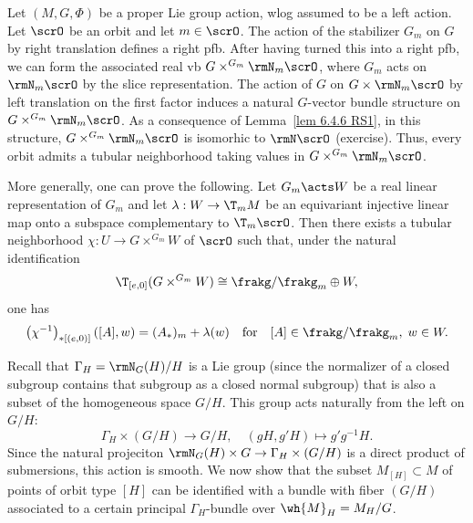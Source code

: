 \begin{rem}[{{\cite[Rem.~6.5.8]{RS1}}}]\label{rem 6.5.8 RS1}
    Let $(M,G,\Phi)$ be a proper Lie group action, \gls{wlog} assumed to be a left action. Let $\scrO$ be an orbit and let $m\in\scrO$. The action of the stabilizer $G_m$ on $G$ by right translation defines a right \gls{pfb}. After having turned this into a right \gls{pfb}, we can form the associated real \gls{vb} $G\times^{G_m}\rmN_m\scrO$, where $G_m$ acts on $\rmN_m\scrO$ by the slice representation. The action of $G$ on $G\times\rmN_m\scrO$ by left translation on the first factor induces a natural $G$-vector bundle structure on $G\times^{G_m}\rmN_m\scrO$. As a consequence of Lemma~\ref{lem 6.4.6 RS1}, in this structure,  $G\times^{G_m}\rmN_m\scrO$ is isomorhic to $\rmN\scrO$ (exercise). Thus, every orbit admits a tubular neighborhood taking values in $G\times^{G_m}\rmN_m\scrO$.

    More generally, one can prove the following. Let $G_m\acts W$ be a real linear representation of $G_m$ and let $\lambda:W\to \T_m M$ be an equivariant injective linear map onto a subspace complementary to $\T_m\scrO$. Then there exists a tubular neighborhood $\chi:U\to G\times^{G_m}W$ of $\scrO$ such that, under the natural identification 
    \[\T_{[e,0]}(G\times^{G_m}W)\cong \frakg\slash\frakg_m\oplus W,\]
    one has 
    \[\left(\chi^{-1}\right)_{\ast[(e,0)]}\left([A],w\right)=(A_\ast)_m+\lambda(w)\quad\text{for}\quad  [A]\in\frakg\slash\frakg_m,\; w\in W.\]
\end{rem}

Recall that $\Gamma_H=\rmN_G(H)\slash H$ is a Lie group (since the normalizer of a closed subgroup contains that subgroup as a closed normal subgroup) that is also a subset of the homogeneous space $G\slash H$. This group acts naturally from the left on $G\slash H$:
\[\Gamma_H\times (G\slash H)\to G\slash H,\quad (gH,g'H)\mapsto g'g^{-1}H.\]
Since the natural projeciton $\rmN_G(H)\times G\to \Gamma_H\times (G\slash H)$ is a direct product of submersions, this action is smooth. We now show that the subset $M_{[H]}\subset M$ of points of orbit type $[H]$ can be identified with a bundle with fiber $(G\slash H)$ associated to a certain principal $\Gamma_H$-bundle over $\wh{M}_H=M_H\slash G$.

